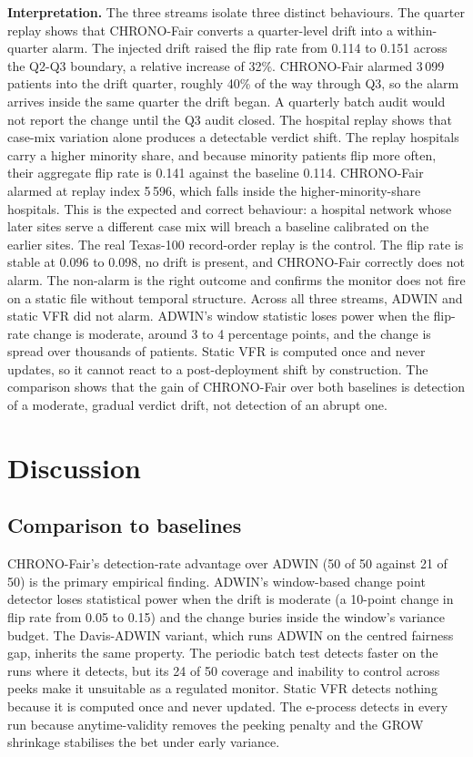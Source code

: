 \documentclass[acmsmall,nonacm,review,anonymous]{acmart}
\newcommand{\1}[1]{\mathbf{1}\!\left\{#1\right\}}
\begin{document}
\textbf{Interpretation.}
The three streams isolate three distinct behaviours. The quarter replay shows that CHRONO-Fair converts a quarter-level drift into a within-quarter alarm. The injected drift raised the flip rate from 0.114 to 0.151 across the Q2-Q3 boundary, a relative increase of 32\%. CHRONO-Fair alarmed 3\,099 patients into the drift quarter, roughly 40\% of the way through Q3, so the alarm arrives inside the same quarter the drift began. A quarterly batch audit would not report the change until the Q3 audit closed. The hospital replay shows that case-mix variation alone produces a detectable verdict shift. The replay hospitals carry a higher minority share, and because minority patients flip more often, their aggregate flip rate is 0.141 against the baseline 0.114. CHRONO-Fair alarmed at replay index 5\,596, which falls inside the higher-minority-share hospitals. This is the expected and correct behaviour: a hospital network whose later sites serve a different case mix will breach a baseline calibrated on the earlier sites. The real Texas-100 record-order replay is the control. The flip rate is stable at 0.096 to 0.098, no drift is present, and CHRONO-Fair correctly does not alarm. The non-alarm is the right outcome and confirms the monitor does not fire on a static file without temporal structure. Across all three streams, ADWIN and static VFR did not alarm. ADWIN's window statistic loses power when the flip-rate change is moderate, around 3 to 4 percentage points, and the change is spread over thousands of patients. Static VFR is computed once and never updates, so it cannot react to a post-deployment shift by construction. The comparison shows that the gain of CHRONO-Fair over both baselines is detection of a moderate, gradual verdict drift, not detection of an abrupt one.

\section{Discussion}\label{sec:discussion}

\subsection{Comparison to baselines}

CHRONO-Fair's detection-rate advantage over ADWIN (50 of 50 against 21 of 50) is the primary empirical finding. ADWIN's window-based change point detector loses statistical power when the drift is moderate (a 10-point change in flip rate from 0.05 to 0.15) and the change buries inside the window's variance budget. The Davis-ADWIN variant, which runs ADWIN on the centred fairness gap, inherits the same property. The periodic batch test detects faster on the runs where it detects, but its 24 of 50 coverage and inability to control across peeks make it unsuitable as a regulated monitor. Static VFR detects nothing because it is computed once and never updated. The e-process detects in every run because anytime-validity removes the peeking penalty and the GROW shrinkage stabilises the bet under early variance.
\end{document}
